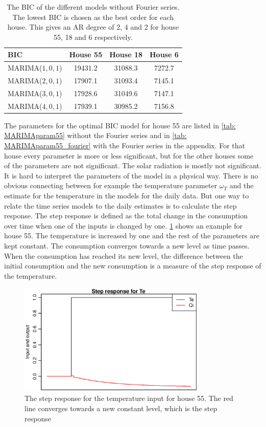 \begin{table}[H]
    \centering
    \begin{tabular}{l|ccc}
    \hline
    \textbf{BIC} & House 55 & House 18 & House 6 \\ \hline \hline
    MARIMA($1,0,1$) & 19431.2 & 31088.3 & 7272.7 \\
    MARIMA($2,0,1$) & 17907.1 & 31093.4 & 7145.1 \\
    MARIMA($3,0,1$) & 17928.6 & 31049.6 & 7147.1 \\
    MARIMA($4,0,1$) & 17939.1 & 30985.2 & 7156.8 \\
    \hline
    \end{tabular}
    \caption{The BIC of the different models without Fourier series. The lowest BIC is chosen as the best order for each house. This gives an AR degree of 2, 4 and 2 for house 55, 18 and 6 respectively.}
      \label{tab: BIC}
\end{table}

\noindent The parameters for the optimal BIC model for house 55 are listed in \cref{tab: MARIMAparam55} without the Fourier series and in \cref{tab: MARIMAparam55_fourier} with the Fourier series in the appendix. For that house every parameter is more or less significant, but for the other houses some of the parameters are not significant. The solar radiation is mostly not significant. It is hard to interpret the parameters of the model in a physical way. There is no obvious connecting between for example the temperature parameter $\omega_T$ and the estimate for the temperature in the models for the daily data. But one way to relate the time series models to the daily estimates is to calculate the step response. The step response is defined as the total change in the consumption over time when one of the inputs is changed by one. \cref{fig:StepResponse55} shows an example for house 55. The temperature is increased by one and the rest of the parameters are kept constant. The consumption converges towards a new level as time passes. When the consumption has reached its new level, the difference between the initial consumption and the new consumption is a measure of the step response of the temperature.


\begin{figure}
    \centering
    \includegraphics[width=0.8\textwidth]{../../../figures/StepResponse.eps}
    \caption{The step response for the temperature input for house 55. The red line converges towards a new constant level, which is the step response}
    \label{fig:StepResponse55}
\end{figure}


